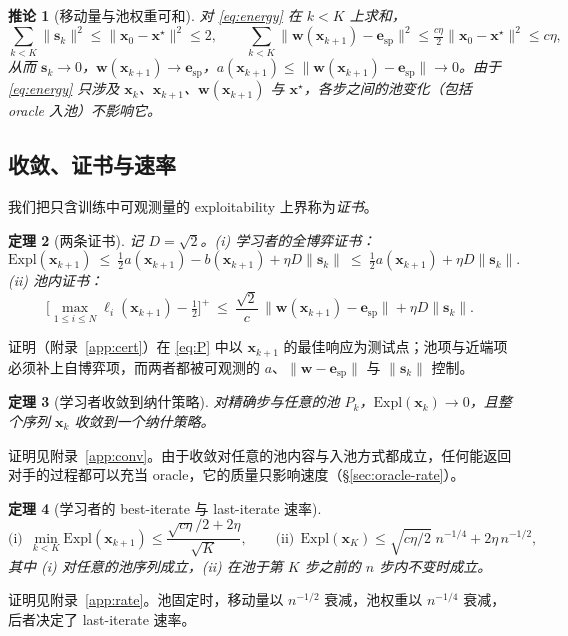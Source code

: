 \documentclass{article}
\theoremstyle{plain}
\newtheorem{theorem}{定理}[section]
\newtheorem{corollary}[theorem]{推论}
\theoremstyle{remark}
\newcommand{\Expl}{\mathrm{Expl}}
\newcommand{\bx}{{\bm{x}}}
\newcommand{\bw}{{\bm{w}}}
\newcommand{\be}{{\bm{e}}}
\newcommand{\xs}{\bx^{\star}}
\newcommand{\dx}{{\bm{s}}}
\newcommand{\esp}{\be_{\mathrm{sp}}}
\begin{document}
\begin{corollary}[移动量与池权重可和]
\label{cor:sum}
对 \eqref{eq:energy} 在 $k<K$ 上求和，
\[
\textstyle\sum_{k<K}\|\dx_k\|^2\le\|\bx_0-\xs\|^2\le2,\qquad
\sum_{k<K}\|\bw(\bx_{k+1})-\esp\|^2\le\tfrac{c\eta}2\|\bx_0-\xs\|^2\le c\eta ,
\]
从而 $\dx_k\to0$，$\bw(\bx_{k+1})\to \esp$，$a(\bx_{k+1})\le\|\bw(\bx_{k+1})-\esp\|\to0$。由于 \eqref{eq:energy} 只涉及 $\bx_k$、$\bx_{k+1}$、$\bw(\bx_{k+1})$ 与 $\xs$，各步之间的池变化（包括 oracle 入池）不影响它。
\end{corollary}

\subsection{收敛、证书与速率}
\label{sec:conv}

我们把只含训练中可观测量的 exploitability 上界称为\emph{证书}。

\begin{theorem}[两条证书]
\label{thm:cert}
记 $D=\sqrt2$。(i) 学习者的全博弈证书：
\[
\Expl(\bx_{k+1})\ \le\ \tfrac12a(\bx_{k+1})-b(\bx_{k+1})+\eta D\|\dx_k\|\ \le\ \tfrac12a(\bx_{k+1})+\eta D\|\dx_k\| .
\]
(ii) 池内证书：
\[
\Big[\max_{1\le i\le N}\ell_i(\bx_{k+1})-\tfrac12\Big]^+\ \le\ \frac{\sqrt2}{c}\,\|\bw(\bx_{k+1})-\esp\|+\eta D\|\dx_k\| .
\]
\end{theorem}
证明（附录~\ref{app:cert}）在 \eqref{eq:P} 中以 $\bx_{k+1}$ 的最佳响应为测试点；池项与近端项必须补上自博弈项，而两者都被可观测的 $a$、$\|\bw-\esp\|$ 与 $\|\dx_k\|$ 控制。

\begin{theorem}[学习者收敛到纳什策略]
\label{thm:conv}
对精确步与任意的池 $P_k$，$\Expl(\bx_k)\to0$，且整个序列 $\bx_k$ 收敛到一个纳什策略。
\end{theorem}
证明见附录~\ref{app:conv}。由于收敛对任意的池内容与入池方式都成立，任何能返回对手的过程都可以充当 oracle，它的质量只影响速度（\S\ref{sec:oracle-rate}）。

\begin{theorem}[学习者的 best-iterate 与 last-iterate 速率]
\label{thm:rate}
\[
\text{(i)}\ \ \min_{k<K}\Expl(\bx_{k+1})\le\frac{\sqrt{c\eta}/2+2\eta}{\sqrt K},\qquad
\text{(ii)}\ \ \Expl(\bx_K)\le\sqrt{c\eta/2}\;n^{-1/4}+2\eta\,n^{-1/2},
\]
其中 (i) 对任意的池序列成立，(ii) 在池于第 $K$ 步之前的 $n$ 步内不变时成立。
\end{theorem}
证明见附录~\ref{app:rate}。池固定时，移动量以 $n^{-1/2}$ 衰减，池权重以 $n^{-1/4}$ 衰减，后者决定了 last-iterate 速率。
\end{document}
